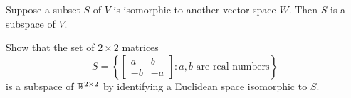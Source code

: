 \begin{applicationActivities}
\begin{fact}
  Suppose a subset \(S\) of \(V\) is isomorphic to another vector space
  \(W\).
  Then \(S\) is a subspace of \(V\).
\end{fact}

\begin{activity}{5}
  Show that the set of \(2\times 2\) matrices
  \[S=
    \left\{
    \begin{bmatrix}a&b\\-b&-a\end{bmatrix} :
    a,b\text{ are real numbers}
    \right\}
  \]
  is a subspace of \(\mathbb{R}^{2\times 2}\) by identifying a Euclidean
  space isomorphic to \(S\).
\end{activity}



\end{applicationActivities}
